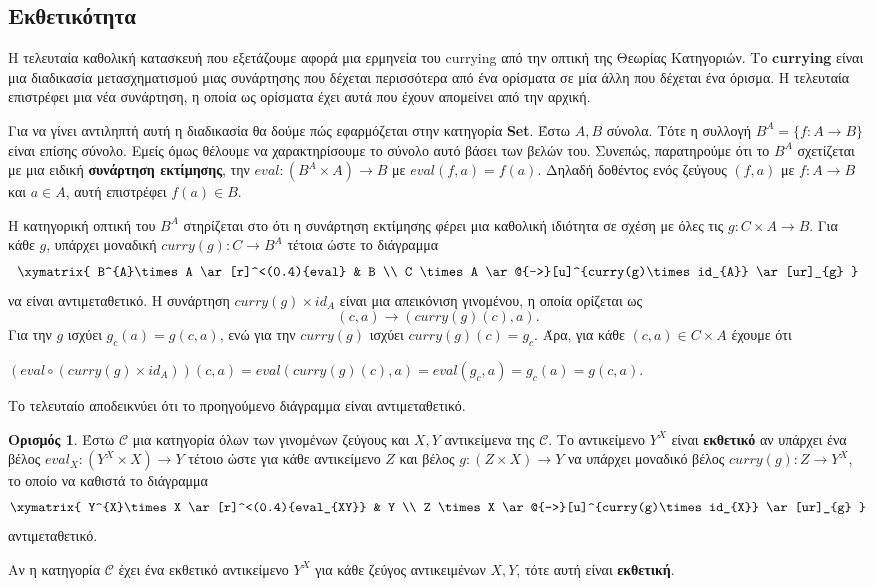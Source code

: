 \documentclass [a4paper,11pt] {book}
\theoremstyle{definition}
\theoremstyle{definition}
\newtheorem{definition}[theorem]{Ορισμός}
\begin{document}
\subsection{Εκθετικότητα}
\label{exponentiation}
Η τελευταία καθολική κατασκευή που εξετάζουμε αφορά μια ερμηνεία του currying από την οπτική της Θεωρίας Κατηγοριών. Το \textbf{currying} είναι μια διαδικασία μετασχηματισμού μιας συνάρτησης που δέχεται περισσότερα από ένα ορίσματα σε μία άλλη που δέχεται ένα όρισμα. Η τελευταία επιστρέφει μια νέα συνάρτηση, η οποία ως ορίσματα έχει αυτά που έχουν απομείνει από την αρχική.

Για να γίνει αντιληπτή αυτή η διαδικασία θα δούμε πώς εφαρμόζεται στην κατηγορία \textbf{Set}. Έστω $A,B$ σύνολα. Τότε η συλλογή $B^{A}=\{f:A\to B\}$ είναι επίσης σύνολο. Εμείς όμως θέλουμε να χαρακτηρίσουμε το σύνολο αυτό βάσει των βελών του. Συνεπώς, παρατηρούμε ότι το $B^{A}$ σχετίζεται με μια ειδική \textbf{συνάρτηση εκτίμησης}, την $eval:(B^{A}\times A) \to B$ με $eval(f,a)=f(a)$. Δηλαδή δοθέντος ενός ζεύγους $(f,a)$ με $f:A\to B$ και $a\in A$, αυτή επιστρέφει $f(a)\in B$.

Η κατηγορική οπτική του $B^{A}$ στηρίζεται στο ότι η συνάρτηση εκτίμησης φέρει μια καθολική ιδιότητα σε σχέση με όλες τις $g:C\times A\to B$. Για κάθε $g$, υπάρχει μοναδική $curry(g):C\to B^{A}$ τέτοια ώστε το διάγραμμα
\begin{displaymath}
\xymatrix{
B^{A}\times A \ar[r]^<(0.4){eval} & B \\
C \times A \ar@{-->}[u]^{curry(g)\times id_{A}} \ar[ur]_{g}
}
\end{displaymath}
να είναι αντιμεταθετικό. Η συνάρτηση $curry(g) \times id_{A}$ είναι μια απεικόνιση γινομένου, η οποία ορίζεται ως \begin{equation*}
(c,a)\to (curry(g)(c),a).
\end{equation*}Για την $g$ ισχύει $g_{c}(a)=g(c,a)$, ενώ για την $curry(g)$ ισχύει $curry(g)(c)=g_{c}$. Άρα, για κάθε $(c,a)\in C\times A$ έχουμε ότι
\begin{center}
$(eval \circ (curry(g)\times id_{A}))(c,a)=eval(curry(g)(c),a)=eval(g_{c},a)=g_{c}(a)=g(c,a)$.
\end{center}
Το τελευταίο αποδεικνύει ότι το προηγούμενο διάγραμμα είναι αντιμεταθετικό.
\begin{definition}\label{exponentialObject}
Έστω $\mathcal{C}$ μια κατηγορία όλων των γινομένων ζεύγους και $X,Y$ αντικείμενα της $\mathcal{C}$. Το αντικείμενο $Y^{X}$ είναι \textbf{εκθετικό} αν υπάρχει ένα βέλος $eval_{X}:(Y^{X}\times X)\to Y$ τέτοιο ώστε για κάθε αντικείμενο $Z$ και βέλος $g:(Z\times X)\to Y$ να υπάρχει μοναδικό βέλος $curry(g):Z\to Y^{X}$, το οποίο να καθιστά το διάγραμμα
\begin{displaymath}
\xymatrix{
Y^{X}\times X \ar[r]^<(0.4){eval_{XY}} & Y \\
Z \times X \ar@{-->}[u]^{curry(g)\times id_{X}} \ar[ur]_{g}
}
\end{displaymath}
αντιμεταθετικό.
\end{definition}
Αν η κατηγορία $\mathcal{C}$ έχει ένα εκθετικό αντικείμενο $Y^{X}$ για κάθε ζεύγος αντικειμένων $X,Y$, τότε αυτή είναι \textbf{εκθετική}.
\end{document}
